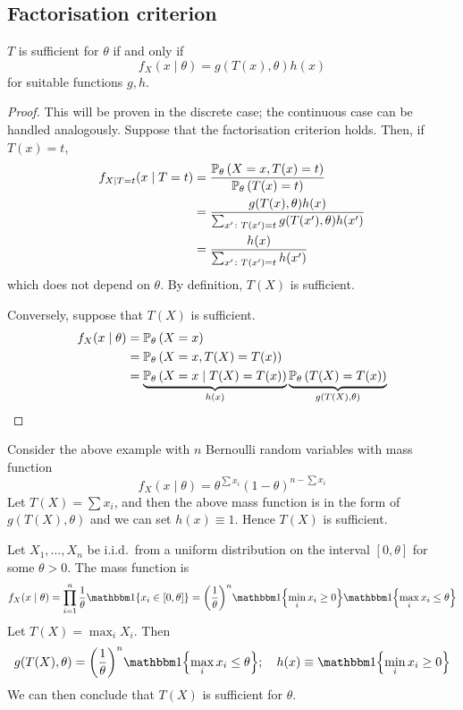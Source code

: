 \subsection{Factorisation criterion}
\begin{theorem}
	\( T \) is sufficient for \( \theta \) if and only if
	\[
		f_X(x \mid \theta) = g(T(x), \theta) h(x)
	\]
	for suitable functions \( g,h \).
\end{theorem}
\begin{proof}
	This will be proven in the discrete case; the continuous case can be handled analogously.
	Suppose that the factorisation criterion holds.
	Then, if \( T(x) = t \),
	\begin{align*}
		f_{X \mid T = t}(x \mid T = t) & = \frac{\mathbb{P}_{\theta}\left({X = x, T(x) = t}\right)}{\mathbb{P}_{\theta}\left({T(x) = t}\right)}             \\
		                               & = \frac{g(T(x),\theta)h(x)}{\sum_{x' \colon T(x') = t} g(T(x'),\theta)h(x')} \\
		                               & = \frac{h(x)}{\sum_{x' \colon T(x') = t} h(x')}
	\end{align*}
	which does not depend on \( \theta \).
	By definition, \( T(X) \) is sufficient.

	Conversely, suppose that \( T(X) \) is sufficient.
	\begin{align*}
		f_X(x \mid \theta) & = \mathbb{P}_{\theta}\left({X = x}\right)                                                                                                \\
		                   & = \mathbb{P}_{\theta}\left({X = x, T(X) = T(x)}\right)                                                                                   \\
		                   & = \underbrace{\mathbb{P}_{\theta}\left({X = x \mid T(X) = T(x)}\right)}_{h(x)} \underbrace{\mathbb{P}_{\theta}\left({T(X) = T(x)}\right)}_{g(T(X), \theta)}
	\end{align*}
\end{proof}
\begin{example}
	Consider the above example with \( n \) Bernoulli random variables with mass function
	\[
		f_X(x \mid \theta) = \theta^{\sum x_i} (1-\theta)^{n - \sum x_i}
	\]
	Let \( T(X) = \sum x_i \), and then the above mass function is in the form of \( g(T(X), \theta) \) and we can set \( h(x) \equiv 1 \).
	Hence \( T(X) \) is sufficient.
\end{example}
\begin{example}
	Let \( X_1, \dots, X_n \) be i.i.d.\ from a uniform distribution on the interval \( [0,\theta] \) for some \( \theta > 0 \).
	The mass function is
	\[
		f_X(x \mid \theta) = \prod_{i=1}^n \frac{1}{\theta} \mathbbm 1\qty{x_i \in [0,\theta]} = \qty(\frac{1}{\theta})^{n} \mathbbm 1\qty{\min_i x_i \geq 0} \mathbbm 1\qty{\max_i x_i \leq \theta}
	\]
	Let \( T(X) = \max_i X_i \).
	Then
	\[
		g(T(X), \theta) = \qty(\frac{1}{\theta})^n \mathbbm 1\qty{\max_i x_i \leq \theta};\quad h(x) \equiv \mathbbm 1\qty{\min_i x_i \geq 0}
	\]
	We can then conclude that \( T(X) \) is sufficient for \( \theta \).
\end{example}

